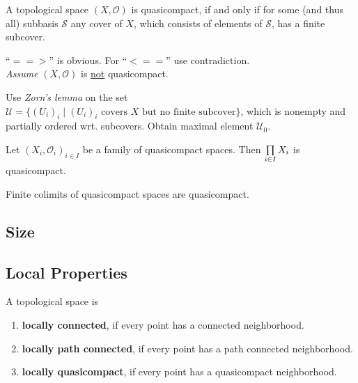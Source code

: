 \begin{theorem}
	A topological space $(X,\mathcal{O})$ is quasicompact, if and only if for some (and thus all) subbasis $\mathcal{S}$ any cover of $X$, which consists of elements of $\mathcal{S}$, has a finite subcover.
\end{theorem}

\begin{sketch}
	\enquote{$==>$} is obvious. For \enquote{$<==$} use contradiction.\\
	\textit{Assume} $(X,\mathcal{O})$ is \underline{not} quasicompact.
	\begin{tab}[1.3cm]
		Use \textit{Zorn's lemma} on the set $\mathcal{U} = \{(U_i)_i \mid (U_i)_i \text{ covers } X \text{ but no finite subcover}\}$, which is nonempty and partially ordered wrt. subcovers. Obtain maximal element $\mathcal{U}_0$. 
	\end{tab}
\end{sketch}

\begin{corollary}
	Let $(X_i, \mathcal{O}_i)_{i\in I}$ be a family of quasicompact spaces. Then $\prod \limits_{i \in I} X_i$ is quasicompact.
\end{corollary}

\begin{lemma}
	Finite colimits of quasicompact spaces are quasicompact.
\end{lemma}
\begin{sketch}
\end{sketch}


\newpage
\subsection{Size}

\subsection{Local Properties}
\begin{definition}
	A topological space is
	\begin{enumerate}[$\bullet$]
		\item{
			\textbf{locally connected}, if every point has a connected neighborhood.
		}
		\item{
			\textbf{locally path connected}, if every point has a path connected neighborhood.
		}
		\item{
			\textbf{locally quasicompact}, if every point has a quasicompact neighborhood.
		}
	\end{enumerate}
\end{definition}

